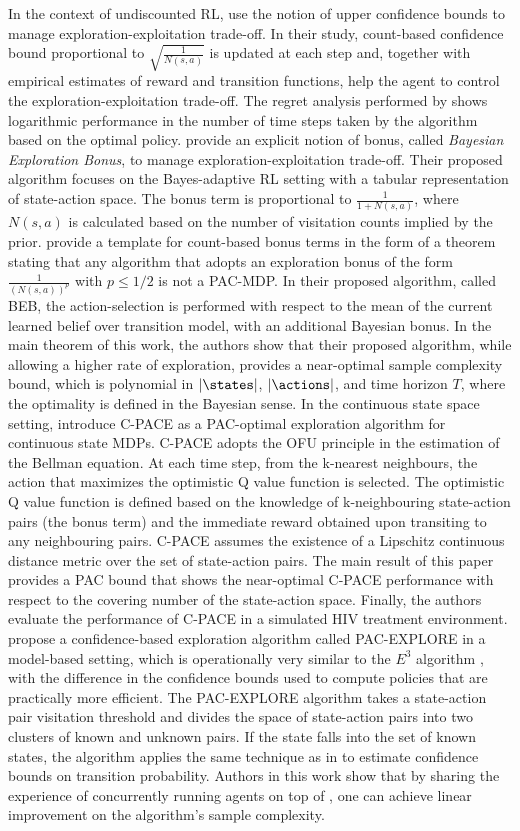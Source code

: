 In the context of undiscounted RL,  use the notion of upper confidence bounds to manage exploration-exploitation trade-off. In their study, count-based confidence bound proportional to $\sqrt{\frac{1}{N(s,a)}}$ is updated at each step and, together with empirical estimates of reward and transition functions, help the agent to control the exploration-exploitation trade-off. The regret analysis performed by  shows logarithmic performance in the number of time steps taken by the algorithm based on the optimal policy. 
 provide an explicit notion of bonus, called \textit{Bayesian Exploration Bonus}, to manage exploration-exploitation trade-off. Their proposed algorithm focuses on the Bayes-adaptive RL setting with a tabular representation of state-action space. The bonus term is proportional to $\frac{1}{1+N(s,a)}$, where $N(s,a)$ is calculated based on the number of visitation counts implied by the prior.  provide a template for count-based bonus terms in the form of a theorem stating that any algorithm that adopts an exploration bonus of the form $\frac{1}{(N(s,a))^p}$ with $p \leq 1/2$ is not a PAC-MDP. In their proposed algorithm, called BEB, the action-selection is performed with respect to the mean of the current learned belief over transition model, with an additional Bayesian bonus. In the main theorem of this work, the authors show that their proposed algorithm, while allowing a higher rate of exploration, provides a near-optimal sample complexity bound, which is polynomial in $|\states|$, $|\actions|$, and time horizon $T$, where the optimality is defined in the Bayesian sense.
In the continuous state space setting,  introduce C-PACE as a PAC-optimal exploration algorithm for continuous state MDPs. C-PACE adopts the OFU principle in the estimation of the Bellman equation. At each time step, from the k-nearest neighbours, the action that maximizes the optimistic Q value function is selected. The optimistic Q value function is defined based on the knowledge of k-neighbouring state-action pairs (the bonus term) and the immediate reward obtained upon transiting to any neighbouring pairs. C-PACE assumes the existence of a Lipschitz continuous distance metric over the set of state-action pairs. The main result of this paper provides a PAC bound that shows the near-optimal C-PACE performance with respect to the covering number of the state-action space. Finally, the authors evaluate the performance of C-PACE in a simulated HIV treatment environment.
 propose a confidence-based exploration algorithm called PAC-EXPLORE in a model-based setting, which is operationally very similar to the $E^3$ algorithm , with the difference in the confidence bounds used to compute policies that are practically more efficient. The PAC-EXPLORE algorithm takes a state-action pair visitation threshold and divides the space of state-action pairs into two clusters of known and unknown pairs. If the state falls into the set of known states, the algorithm applies the same technique as in  to estimate confidence bounds on transition probability. Authors in this work show that by sharing the experience of concurrently running agents on top of , one can achieve linear improvement on the algorithm's sample complexity.
